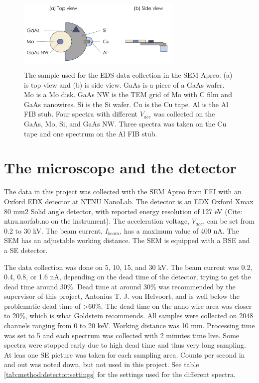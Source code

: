 \begin{figure}[ht]
    \centering
    \colorbox{white}{\includegraphics[width=0.7\textwidth]{figures/Materials-sample1.png}}
    \caption{
        The sample used for the EDS data collection in the SEM Apreo.
        (a) is top view and (b) is side view.
        GaAs is a piece of a GaAs wafer.
        Mo is a Mo disk.
        GaAs NW is the TEM grid of Mo with C film and GaAs nanowires.
        Si is the Si wafer.
        Cu is the Cu tape.
        Al is the Al FIB stub.
        Four spectra with different $V_{acc}$ was collected on the GaAs, Mo, Si, and GaAs NW.
        Three spectra was taken on the Cu tape and one spectrum on the Al FIB stub.
    }
    \label{fig:method:materials:sample1}
\end{figure}



%
%
\section{The microscope and the detector}
\label{sec:method:detector}
The data in this project was collected with the SEM Apreo from FEI with an Oxford EDX detector at NTNU NanoLab.
The detector is an EDX Oxford Xmax 80 mm2 Solid angle detector, with reported energy resolution of 127 eV (Cite: ntnu.norfab.no on the instrument).
The acceleration voltage, $V_{acc}$, can be set from 0.2 to 30 kV.
The beam current, $I_{beam}$, has a maximum value of 400 nA.
The SEM has an adjustable working distance.
The SEM is equipped with a BSE and a SE detector.

The data collection was done on 5, 10, 15, and 30 kV.
The beam current was 0.2, 0.4, 0.8, or 1.6 nA, depending on the dead time of the detector, trying to get the dead time around 30\%.
Dead time at around 30\% was recommended by the supervisor of this project, Antonius T. J. von Helvoort, and is well below the problematic dead time of >60\%.
The dead time on the nano wire area was closer to 20\%, which is what Goldstein \cite[page 223]{goldstein_scanning_2018} recommends.
All samples were collected on 2048 channels ranging from 0 to 20 keV.
Working distance was 10 mm.
Processing time was set to 5 and each spectrum was collected with 2 minutes time live.
Some spectra were stopped early due to high dead time and thus very long sampling.
At leas one SE picture was taken for each sampling area.
Counts per second in and out was noted down, but not used in this project.
See table \ref{tab:method:detector:settings} for the settings used for the different spectra.

